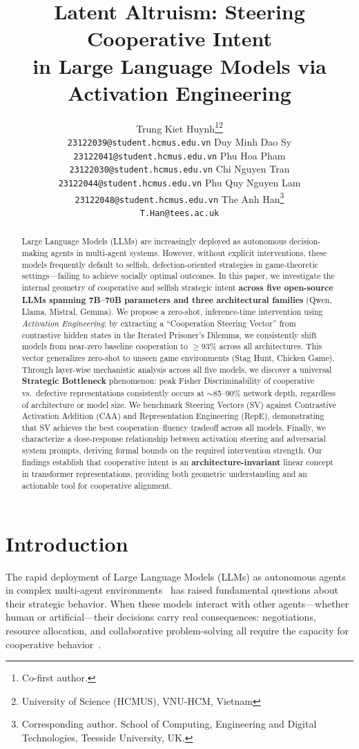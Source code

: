 \documentclass{article}
\title{Latent Altruism: Steering Cooperative Intent\\in Large Language Models via Activation Engineering}
\author{%
  Trung Kiet Huynh\thanks{Co-first author.}\thanks{University of Science (HCMUS), VNU-HCM, Vietnam} \\
  \texttt{23122039@student.hcmus.edu.vn}
  \And
  Duy Minh Dao Sy\footnotemark[1]\footnotemark[2] \\
  \texttt{23122041@student.hcmus.edu.vn}
  \AND
  Phu Hoa Pham\footnotemark[2] \\
  \texttt{23122030@student.hcmus.edu.vn}
  \And
  Chi Nguyen Tran\footnotemark[2] \\
  \texttt{23122044@student.hcmus.edu.vn}
  \AND
  Phu Quy Nguyen Lam\footnotemark[2] \\
  \texttt{23122048@student.hcmus.edu.vn}
  \And
  The Anh Han\thanks{Corresponding author. School of Computing, Engineering and Digital Technologies, Teesside University, UK.} \\
  \texttt{T.Han@tees.ac.uk}
}
\begin{document}
\maketitle

\begin{abstract}
Large Language Models (LLMs) are increasingly deployed as autonomous decision-making agents in multi-agent systems. However, without explicit interventions, these models frequently default to selfish, defection-oriented strategies in game-theoretic settings---failing to achieve socially optimal outcomes. In this paper, we investigate the internal geometry of cooperative and selfish strategic intent \textbf{across five open-source LLMs spanning 7B--70B parameters and three architectural families} (Qwen, Llama, Mistral, Gemma). We propose a zero-shot, inference-time intervention using \textit{Activation Engineering}: by extracting a ``Cooperation Steering Vector'' from contrastive hidden states in the Iterated Prisoner's Dilemma, we consistently shift models from near-zero baseline cooperation to $\geq 93\%$ across all architectures. This vector generalizes zero-shot to unseen game environments (Stag Hunt, Chicken Game). Through layer-wise mechanistic analysis across all five models, we discover a universal \textbf{Strategic Bottleneck} phenomenon: peak Fisher Discriminability of cooperative vs.\ defective representations consistently occurs at $\sim$85--90\% network depth, regardless of architecture or model size. We benchmark Steering Vectors (SV) against Contrastive Activation Addition (CAA) and Representation Engineering (RepE), demonstrating that SV achieves the best cooperation--fluency tradeoff across all models. Finally, we characterize a dose-response relationship between activation steering and adversarial system prompts, deriving formal bounds on the required intervention strength. Our findings establish that cooperative intent is an \textbf{architecture-invariant} linear concept in transformer representations, providing both geometric understanding and an actionable tool for cooperative alignment.
\end{abstract}


\section{Introduction}
\label{sec:intro}

The rapid deployment of Large Language Models (LLMs) as autonomous agents in complex multi-agent environments~\citep{park2023generative, wang2023voyager} has raised fundamental questions about their strategic behavior. When these models interact with other agents---whether human or artificial---their decisions carry real consequences: negotiations, resource allocation, and collaborative problem-solving all require the capacity for cooperative behavior~\citep{duan2024gtbench}.
\end{document}
